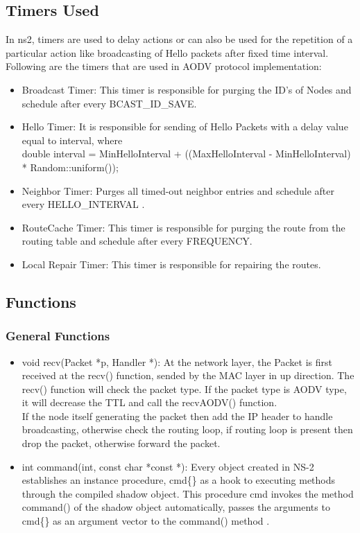 \documentclass[times,10pt,onecolumn]{article}
\begin{document}
\subsection{Timers Used}
\label{sec:timers}
In ns2, timers are used to delay actions or can also be used for the repetition of a particular action like broadcasting of Hello packets after fixed time interval. Following are the timers that are used in AODV protocol implementation:

\begin{itemize}
\item Broadcast Timer: This timer is responsible for purging the ID's of Nodes and schedule after every BCAST\_ID\_SAVE.
\item Hello Timer: It is responsible for sending of Hello Packets with a delay value equal to interval, where \\
double interval = MinHelloInterval +
                 ((MaxHelloInterval - MinHelloInterval) *
Random::uniform()); 
\item Neighbor Timer: Purges all timed-out neighbor entries and schedule after every HELLO\_INTERVAL .
\item RouteCache Timer: This timer is responsible for purging the route from the routing table and schedule after every FREQUENCY.
\item Local Repair Timer: This timer is responsible for repairing the routes.
\end{itemize}

\vspace{20pt}

\subsection{Functions}
\label{sec:functions}

\subsubsection{General Functions}
\label{sec:genfun}
\begin{itemize}
\item void recv(Packet *p, Handler *): At the network layer, the Packet is first received at the recv() function, sended by the MAC layer in up direction. The recv() function will check the packet type. If the packet type is AODV type, it will decrease the TTL and call the recvAODV() function.\\
If the node itself generating the packet then add the IP header to handle broadcasting, otherwise check the routing loop, if routing loop is present then drop the packet, otherwise forward the packet.
\item int command(int, const char *const *): Every object created in NS-2 establishes an instance procedure, cmd\{\} as a hook to executing methods through the compiled shadow object. This procedure cmd{} invokes the method command() of the shadow object automatically, passes the arguments to cmd\{\} as an argument vector to the command() method \cite{IEEEhowto:nsmanual}.


\end{itemize}
\end{document}
